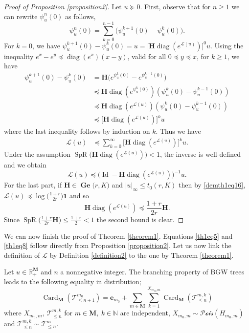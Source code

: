 \documentclass[reqno,final,11pt]{amsart}
\theoremstyle{plain}
\theoremstyle{definition}
\theoremstyle{remark}
\newcommand{\R}{\mathds{R}}
\newcommand{\N}{\mathds{N}}
\newcommand{\M}{\bm{M}}
\newcommand{\Ge}[2]{\bm{\Gel(} #1,#2 \bm{)} }
\newcommand{\T}{\mathcal{T}}
\renewcommand{\L}{\bm{\mathscr{L}}}
\newcommand{\ones}{\bm{1}}
\newcommand{\e}{\bm{e}}
\renewcommand{\H}{\bm{H}}
\newcommand{\pos}{\R_+^{\M}}
\newcommand{\Pois}{\mathscr{P}\!\mathscr{o}\!\mathscr{i}\!\mathscr{s}}
\DeclareMathOperator{\card}{Card}
\DeclareMathOperator{\diag}{diag}
\DeclareMathOperator{\spr}{SpR}
\DeclareMathOperator{\Gel}{Ge}
\DeclareMathOperator{\Id}{Id}
\begin{document}
\begin{proof}[Proof of Proposition \ref{proposition2}]
    Let $u\succeq 0$. First, observe that for $n\geq 1$ we can rewrite $\psi_{u}^n(0)$ as follows,
    \begin{equation*}
        \psi_{u}^n(0) = \sum_{k=0}^{n-1} \big(\psi_{u}^{k+1}(0)-\psi_{u}^k(0)\big).
    \end{equation*}
    For $k=0$, we have $\psi_{u}^{k+1}(0)-\psi_{u}^k(0)= u = \big[\H\diag(e^{\L(u)})\big]^0  u$. Using the inequality $e^x-e^y \preceq \diag(e^x)(x-y)$, valid for all $0\preceq y\preceq x$, for $k\geq 1$, we have
    \begin{align*}
        \psi_{u}^{k+1}(0)-\psi_{u}^k(0) & = \H\big( e^{\psi_{u}^k(0)} - e^{\psi_{u}^{k-1}(0)}\big) \\
        & \preceq \H\diag(e^{\psi_u^k(0)}) (\psi_{u}^k(0) - \psi_{u}^{k-1}(0)) \\
        & \preceq  \H \diag(e^{\L(u)}) (\psi_{u}^k(0) - \psi_{u}^{k-1}(0)) \\
        & \preceq \big[ \H\diag(e^{\L(u)}) \big]^k  u
    \end{align*}
    where the last inequality follows by induction on $k$. Thus we have
    \begin{align*}
        \L(u) & \preceq \sum_{k=0}^{\infty} \big[ \H\diag(e^{\L(u)}) \big]^k  u.
    \end{align*}
    Under the assumption $\spr\big(\H\diag(e^{\L(u)})\big)<1$, the inverse is well-defined and we obtain
    \[\L(u) \preceq  \big(\Id - \H\diag(e^{\L(u)})\big)^{-1} u.\]
    For the last part, if $\H\in\Ge{r}{K}$ and $\vert u\vert_{\infty} \leq t_0(r,K)$ then by \eqref{demth1eq16}, $\L(u) \preceq \log\big(\frac{1+r}{2r}\big)\ones$ and so
    \[ \H\diag(e^{\L(u)}) \preceq \frac{1+r}{2r} \H.\]
    Since $\spr\big(\frac{1+r}{2r} \H \big)\leq \frac{1+r}{2}<1$ the second bound is clear.
\end{proof}

We can now finish the proof of Theorem \ref{theorem1}. Equations \eqref{th1eq5} and \eqref{th1eq8} follow directly from Proposition \ref{proposition2}. Let us now link the definition of $\L$ by Definition \ref{definition2} to the one by Theorem \ref{theorem1}.

Let $u\in\pos$ and $n$ a nonnegative integer. The branching property of BGW trees leads to the following equality in distribution;
\begin{equation}
    \card_{\M}(\T^{m_0}_{\leq n+1}) = \e_{m_0} + \sum_{m\in\M} \sum_{k=1}^{X_{m_0,m}} \card_{\M}(\T^{m,k}_{\leq n})
\end{equation}
where $X_{m_0,m}, \ \T^{m,k}_{\leq n}$ for $m\in\M, \ k\in\N$ are independent, $X_{m_0,m} \sim \Pois(H_{m_0,m})$ and $\T^{m,k}_{\leq n} \sim \T^{m}_{\leq n}$.
\end{document}
